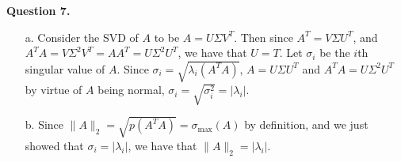 \documentclass{article}
\begin{document}
\textbf{Question 7.} 
\begin{itemize}
    \item[a.] Consider the SVD of $A$ to be $A=U\Sigma V^T$. Then since $A^T = V\Sigma U^T$, and $A^TA = V\Sigma^2 V^T = AA^T = U\Sigma^2U^T$, we have that $U=T$. Let $\sigma_i$ be the $i$th singular value of $A$. Since $\sigma_i = \sqrt{\lambda_i(A^TA)}$, $A = U\Sigma U^T$ and  $A^TA = U\Sigma^2 U^T$ by virtue of $A$ being normal, $\sigma_i = \sqrt{\sigma_i^2} = |\lambda_i|$. 
    \item[b.] Since $\|A\|_2 = \sqrt{p(A^TA)} = \sigma_{\max}(A)$ by definition, and we just showed that $\sigma_i = |\lambda_i|$, we have that $\|A\|_2 = |\lambda_i|$. 
\end{itemize}   
\end{document}
